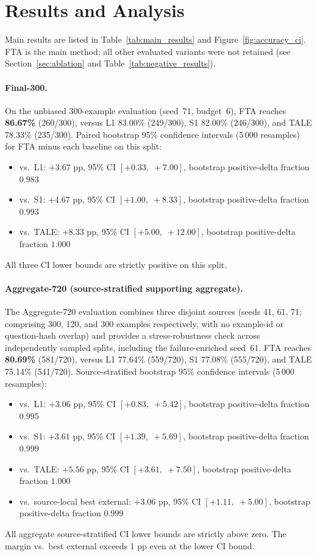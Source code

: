 \section{Results and Analysis}
\label{sec:results}

Main results are listed in Table~\ref{tab:main_results} and
Figure~\ref{fig:accuracy_ci}.
FTA is the main method; all other evaluated variants were not retained
(see Section~\ref{sec:ablation} and Table~\ref{tab:negative_results}).

\paragraph{Final-300.}
On the unbiased 300-example evaluation (seed~71, budget~6), FTA reaches
\textbf{86.67\%} (260/300), versus L1 83.00\% (249/300), S1 82.00\%
(246/300), and TALE 78.33\% (235/300).
Paired bootstrap 95\% confidence intervals (5\,000 resamples) for FTA
minus each baseline on this split:
\begin{itemize}[nosep,leftmargin=1.5em]
  \item vs.\ L1: $+3.67$ pp, 95\% CI $[+0.33,\;+7.00]$, bootstrap
        positive-delta fraction $0.983$
  \item vs.\ S1: $+4.67$ pp, 95\% CI $[+1.00,\;+8.33]$, bootstrap
        positive-delta fraction $0.993$
  \item vs.\ TALE: $+8.33$ pp, 95\% CI $[+5.00,\;+12.00]$, bootstrap
        positive-delta fraction $1.000$
\end{itemize}
All three CI lower bounds are strictly positive on this split.

\paragraph{Aggregate-720 (source-stratified supporting aggregate).}
The Aggregate-720 evaluation combines three disjoint sources (seeds 41, 61, 71;
comprising 300, 120, and 300 examples respectively, with no example-id or
question-hash overlap) and provides a stress-robustness check across
independently sampled splits, including the failure-enriched seed~61.
FTA reaches \textbf{80.69\%} (581/720), versus L1 77.64\% (559/720),
S1 77.08\% (555/720), and TALE 75.14\% (541/720).
Source-stratified bootstrap 95\% confidence intervals (5\,000 resamples):
\begin{itemize}[nosep,leftmargin=1.5em]
  \item vs.\ L1: $+3.06$ pp, 95\% CI $[+0.83,\;+5.42]$, bootstrap
        positive-delta fraction $0.995$
  \item vs.\ S1: $+3.61$ pp, 95\% CI $[+1.39,\;+5.69]$, bootstrap
        positive-delta fraction $0.999$
  \item vs.\ TALE: $+5.56$ pp, 95\% CI $[+3.61,\;+7.50]$, bootstrap
        positive-delta fraction $1.000$
  \item vs.\ source-local best external: $+3.06$ pp, 95\% CI $[+1.11,\;+5.00]$,
        bootstrap positive-delta fraction $0.999$
\end{itemize}
All aggregate source-stratified CI lower bounds are strictly above zero.
The margin vs.\ best external exceeds 1 pp even at the lower CI bound.

